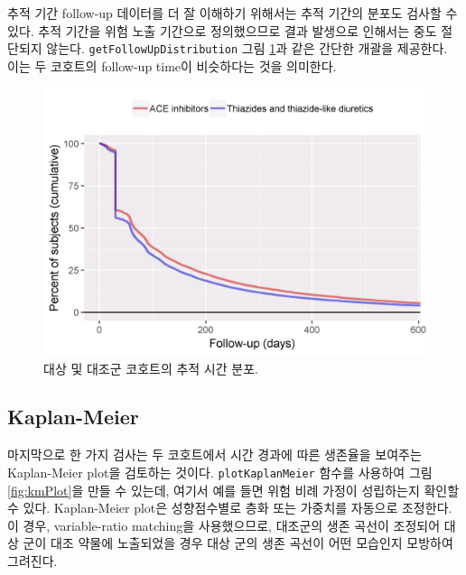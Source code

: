 \documentclass[10.5pt]{book}
\theoremstyle{definition}
\theoremstyle{definition}
\theoremstyle{definition}
\theoremstyle{remark}
\begin{document}
추적 기간 follow-up 데이터를 더 잘 이해하기 위해서는 추적 기간의 분포도
검사할 수 있다. 추적 기간을 위험 노출 기간으로 정의했으므로 결과
발생으로 인해서는 중도 절단되지 않는다. \texttt{getFollowUpDistribution}
그림 \ref{fig:followUp}과 같은 간단한 개괄을 제공한다. 이는 두 코호트의
follow-up time이 비슷하다는 것을 의미한다.

\begin{figure}

{\centering \includegraphics[width=0.8\linewidth]{images/PopulationLevelEstimation/followUp} 

}

\caption{대상 및 대조군 코호트의 추적 시간 분포.}\label{fig:followUp}
\end{figure}

\subsection{Kaplan-Meier}\label{kaplan-meier}

마지막으로 한 가지 검사는 두 코호트에서 시간 경과에 따른 생존율을
보여주는 Kaplan-Meier plot을 검토하는 것이다. \texttt{plotKaplanMeier}
함수를 사용하여 그림 \ref{fig:kmPlot}을 만들 수 있는데, 여기서 예를 들면
위험 비례 가정이 성립하는지 확인할 수 있다. Kaplan-Meier plot은
성향점수별로 층화 또는 가중치를 자동으로 조정한다. 이 경우,
variable-ratio matching을 사용했으므로, 대조군의 생존 곡선이 조정되어
대상 군이 대조 약물에 노출되었을 경우 대상 군의 생존 곡선이 어떤
모습인지 모방하여 그려진다. 
\end{document}
